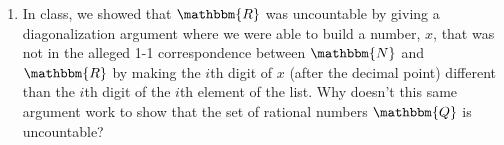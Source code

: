 \documentclass[11pt]{article}
\begin{document}
\begin{enumerate}
\item In class, we showed that $\mathbbm{R}$ was uncountable by giving a diagonalization argument where we were able to build a number, $x$, that was not in the alleged 1-1 correspondence between $\mathbbm{N}$ and $\mathbbm{R}$ by making the $i$th digit of $x$ (after the decimal point) different than the $i$th digit of the $i$th element of the list.  Why doesn't this same argument work to show that the set of rational numbers $\mathbbm{Q}$ is uncountable?  


\end{enumerate}
\end{document}
